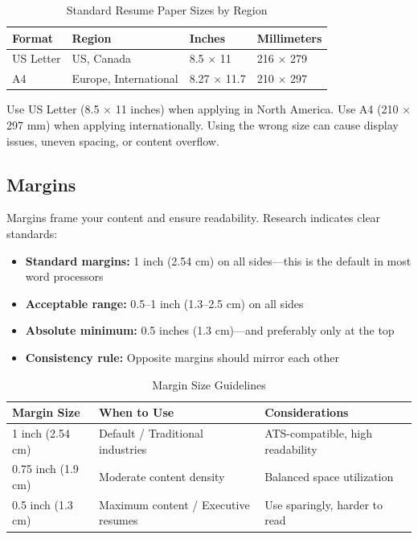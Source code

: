 \documentclass[11pt,a4paper]{article}
\begin{document}
\begin{table}[h]
\centering
\begin{tabular}{@{}llll@{}}
\toprule
\textbf{Format} & \textbf{Region} & \textbf{Inches} & \textbf{Millimeters} \\
\midrule
US Letter & US, Canada & 8.5 $\times$ 11 & 216 $\times$ 279 \\
A4 & Europe, International & 8.27 $\times$ 11.7 & 210 $\times$ 297 \\
\bottomrule
\end{tabular}
\caption{Standard Resume Paper Sizes by Region}
\end{table}

\begin{bestpractice}
Use US Letter (8.5 $\times$ 11 inches) when applying in North America. Use A4 (210 $\times$ 297 mm) when applying internationally. Using the wrong size can cause display issues, uneven spacing, or content overflow.
\end{bestpractice}

\subsection{Margins}

Margins frame your content and ensure readability. Research indicates clear standards:

\begin{itemize}
    \item \textbf{Standard margins:} 1 inch (2.54 cm) on all sides---this is the default in most word processors
    \item \textbf{Acceptable range:} 0.5--1 inch (1.3--2.5 cm) on all sides
    \item \textbf{Absolute minimum:} 0.5 inches (1.3 cm)---and preferably only at the top
    \item \textbf{Consistency rule:} Opposite margins should mirror each other
\end{itemize}

\begin{table}[h]
\centering
\begin{tabular}{@{}lll@{}}
\toprule
\textbf{Margin Size} & \textbf{When to Use} & \textbf{Considerations} \\
\midrule
1 inch (2.54 cm) & Default / Traditional industries & ATS-compatible, high readability \\
0.75 inch (1.9 cm) & Moderate content density & Balanced space utilization \\
0.5 inch (1.3 cm) & Maximum content / Executive resumes & Use sparingly, harder to read \\
\bottomrule
\end{tabular}
\caption{Margin Size Guidelines}
\end{table}
\end{document}
